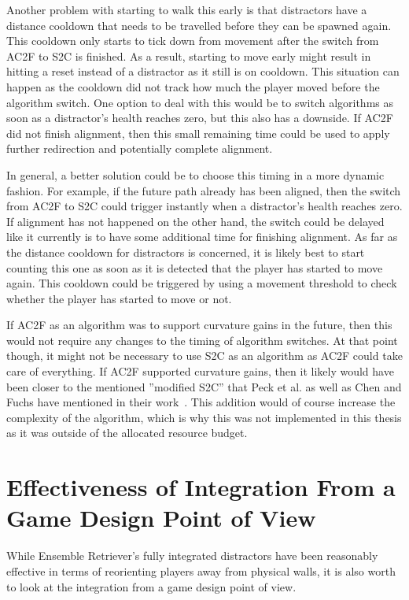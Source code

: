 Another problem with starting to walk this early is that distractors have a distance cooldown that needs to be travelled before they can be spawned again. This cooldown only starts to tick down from movement after the switch from AC2F to S2C is finished. As a result, starting to move early might result in hitting a reset instead of a distractor as it still is on cooldown. This situation can happen as the cooldown did not track how much the player moved before the algorithm switch. One option to deal with this would be to switch algorithms as soon as a distractor's health reaches zero, but this also has a downside. If AC2F did not finish alignment, then this small remaining time could be used to apply further redirection and potentially complete alignment. 

In general, a better solution could be to choose this timing in a more dynamic fashion. For example, if the future path already has been aligned, then the switch from AC2F to S2C could trigger instantly when a distractor's health reaches zero. If alignment has not happened on the other hand, the switch could be delayed like it currently is to have some additional time for finishing alignment. As far as the distance cooldown for distractors is concerned, it is likely best to start counting this one as soon as it is detected that the player has started to move again. This cooldown could be triggered by using a movement threshold to check whether the player has started to move or not.  

If AC2F as an algorithm was to support curvature gains in the future, then this would not require any changes to the timing of algorithm switches. At that point though, it might not be necessary to use S2C as an algorithm as AC2F could take care of everything. If AC2F supported curvature gains, then it likely would have been closer to the mentioned ''modified S2C'' that Peck et al. as well as Chen and Fuchs have mentioned in their work~\cite{peck2010improved, chen2017towards, chen2017supporting}. This addition would of course increase the complexity of the algorithm, which is why this was not implemented in this thesis as it was outside of the allocated resource budget.

\section{Effectiveness of Integration From a Game Design Point of View}
While Ensemble Retriever's fully integrated distractors have been reasonably effective in terms of reorienting players away from physical walls, it is also worth to look at the integration from a game design point of view. 

